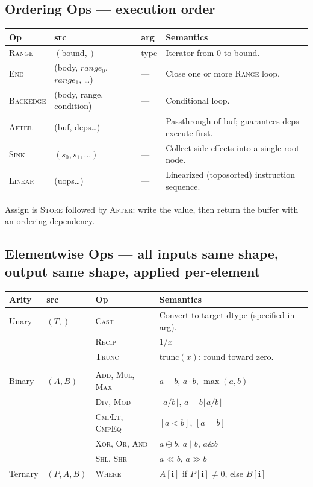 \documentclass[10pt,letterpaper]{article}
\newcommand{\op}[1]{\textsc{#1}}
\begin{document}
\subsection*{{\color{assignbrown}Ordering Ops} \normalfont\small--- execution order}

\begin{tabular}{@{}l l l p{6.0cm}@{}}
\toprule
\textbf{Op} & \textbf{src} & \textbf{arg} & \textbf{Semantics} \\
\midrule
\op{Range} & $(\text{bound},)$ & type & Iterator from $0$ to bound. \\
\op{End} & (body, $range_0$, $range_1$, \ldots) & --- & Close one or more \op{Range} loop. \\
\op{Backedge} & (body, range, condition) & --- & Conditional loop. \\
\op{After} & (buf, deps\ldots) & --- & Passthrough of buf; guarantees deps execute first. \\
\op{Sink} & $(s_0, s_1, \ldots)$ & --- & Collect side effects into a single root node. \\
\op{Linear} & (uops\ldots) & --- & Linearized (toposorted) instruction sequence. \\
\bottomrule
\end{tabular}

\smallskip
Assign is \op{Store} followed by \op{After}: write the value, then return the buffer with an ordering dependency.

\subsection*{{\color{elwyellow}Elementwise Ops} \normalfont\small--- all inputs same shape, output same shape, applied per-element}

\begin{tabular}{@{}l l l l@{}}
\toprule
\textbf{Arity} & \textbf{src} & \textbf{Op} & \textbf{Semantics} \\
\midrule
Unary & $(T,)$
  & \op{Cast}
  & Convert to target dtype (specified in arg). \\
& & \op{Recip}
  & $1/x$ \\
& & \op{Trunc}
  & $\mathrm{trunc}(x)$: round toward zero. \\
  \\[4pt]
Binary & $(A, B)$
  & \op{Add}, \op{Mul}, \op{Max}
  & $a+b$, $a \cdot b$, $\max(a,b)$ \\
& & \op{Div}, \op{Mod}
  & $\lfloor a/b \rfloor$, $a-b\lfloor a/b \rfloor$ \\
& & \op{CmpLt}, \op{CmpEq}
  & $[a < b]$, $[a = b]$ \\
& & \op{Xor}, \op{Or}, \op{And}
  & $a \oplus b$, $a \mid b$, $a \mathbin{\&} b$ \\
& & \op{Shl}, \op{Shr}
  & $a \ll b$, $a \gg b$ \\[4pt]
Ternary & $(P, A, B)$
  & \op{Where}
  & $A[\mathbf{i}]$ if $P[\mathbf{i}] \ne 0$, else $B[\mathbf{i}]$ \\

\bottomrule
\end{tabular}
\end{document}
